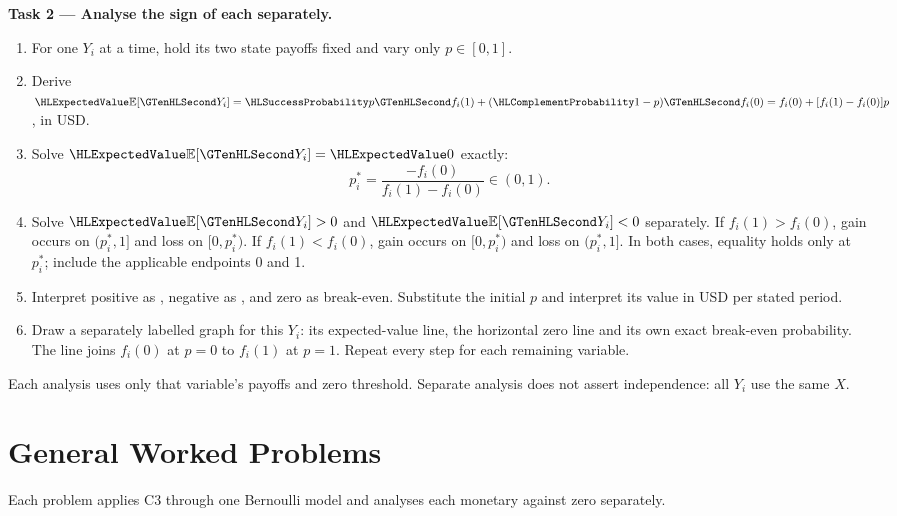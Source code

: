 \textbf{Task 2 --- Analyse the sign of each  separately.}
\begin{enumerate}
\item For one $Y_i$ at a time, hold its two state payoffs fixed and vary only $p\in[0,1]$.
\item Derive $\ExpectedValue{\mathbb E}[\Money{Y_i}]=\SuccessProb{p}\Money{f_i(1)}+(\FailureProb{1-p})\Money{f_i(0)}=f_i(0)+[f_i(1)-f_i(0)]p$, in USD.
\item Solve $\ExpectedValue{\mathbb E}[\Money{Y_i}]=\ExpectedValue{0}$ exactly:
\[
p_i^*=\frac{-f_i(0)}{f_i(1)-f_i(0)}\in(0,1).
\]
\item Solve $\ExpectedValue{\mathbb E}[\Money{Y_i}]>0$ and $\ExpectedValue{\mathbb E}[\Money{Y_i}]<0$ separately.
If $f_i(1)>f_i(0)$, gain occurs on $(p_i^*,1]$ and loss on $[0,p_i^*)$.
If $f_i(1)<f_i(0)$, gain occurs on $[0,p_i^*)$ and loss on $(p_i^*,1]$.
In both cases, equality holds only at $p_i^*$; include the applicable endpoints 0 and 1.
\item Interpret positive  as , negative 
as , and zero as break-even. Substitute the initial $p$ and interpret its value in USD per stated period.
\item Draw a separately labelled graph for this $Y_i$: its expected-value line,
the horizontal zero line and its own exact break-even probability. The line joins
$f_i(0)$ at $p=0$ to $f_i(1)$ at $p=1$. Repeat every step for each remaining variable.
\end{enumerate}
Each analysis uses only that variable's payoffs and zero threshold.
Separate analysis does not assert independence: all $Y_i$ use the same $X$.
\clearpage
\section{General Worked Problems}\label{sec:t2-c3-general}
Each problem applies C3 through one Bernoulli model and analyses each monetary  against zero separately.
